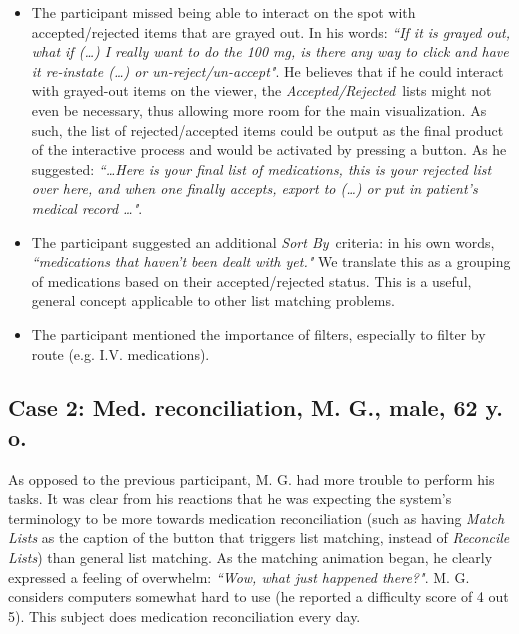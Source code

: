 \documentclass{chi2009}
\newcommand{\AcceptedRejected}{\textit{Accepted/Rejected}}
\newcommand{\SortBy}{\textit{Sort By}}
\begin{document}
\begin{itemize}
\item The participant missed being able to interact on the spot with accepted/rejected items that are grayed out. In his words: \textit{``If it is grayed out, what if (\dots) I really want to do the 100 mg, is there any way to click and have it re-instate (\dots) or un-reject/un-accept"}. He believes that if he could interact with grayed-out items on the viewer, the \AcceptedRejected~lists might not even be necessary, thus allowing more room for the main visualization. As such, the list of rejected/accepted items could be output as the final product of the interactive process and would be activated by pressing a button. As he suggested: \textit{``\dots Here is your final list of medications, this is your rejected list over here, and when one finally accepts, export to (\dots) or put in patient's medical record \dots"}.
\item The participant suggested an additional \SortBy~criteria: in his own words, \textit{``medications that haven't been dealt with yet."} We translate this as a grouping of medications based on their accepted/rejected status. This is a useful, general concept applicable to other list matching problems.
\item The participant mentioned the importance of filters, especially to filter by route (e.g. I.V. medications).  
\end{itemize}

\subsection{Case 2: Med. reconciliation, M. G., male, 62 y. o.}

As opposed to the previous participant, M. G. had more trouble to perform his tasks. It was clear from his reactions that he was expecting the system's terminology to be more towards medication reconciliation (such as having \textit{Match Lists} as the caption of the button that triggers list matching, instead of \textit{Reconcile Lists}) than general list matching. As the matching animation began, he clearly expressed a feeling of overwhelm: \textit{``Wow, what just happened there?"}. M. G. considers computers somewhat hard to use (he reported a difficulty score of 4 out 5). This subject does medication reconciliation every day. 
\end{document}
